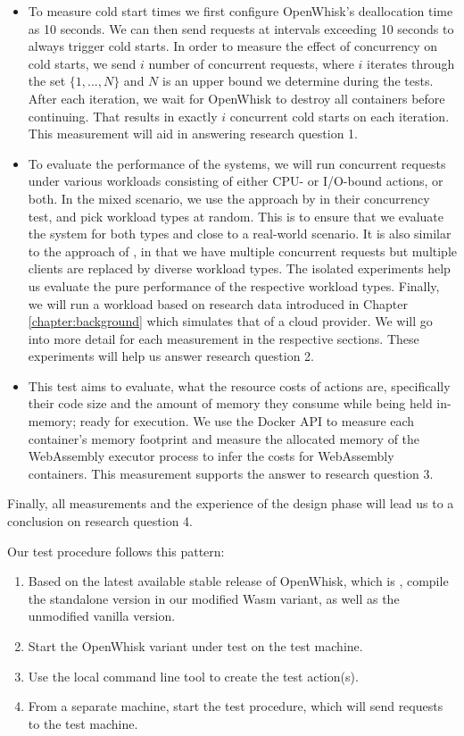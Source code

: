 \begin{itemize}
    \item To measure cold start times we first configure OpenWhisk's deallocation time as 10 seconds. We can then send requests at intervals exceeding 10 seconds to always trigger cold starts. In order to measure the effect of concurrency on cold starts, we send $i$ number of concurrent requests, where $i$ iterates through the set $\{1,...,N\}$ and $N$ is an upper bound we determine during the tests. After each iteration, we wait for OpenWhisk to destroy all containers before continuing. That results in exactly $i$ concurrent cold starts on each iteration. This measurement will aid in answering research question 1.

    \item To evaluate the performance of the systems, we will run concurrent requests under various workloads consisting of either CPU- or I/O-bound actions, or both. In the mixed scenario, we use the approach by \citeauthor{McGrath2017} in their concurrency test, and pick workload types at random. This is to ensure that we evaluate the system for both types and close to a real-world scenario. It is also similar to the approach of \citeauthor{Hall2019}, in that we have multiple concurrent requests but multiple clients are replaced by diverse workload types. The isolated experiments help us evaluate the pure performance of the respective workload types. Finally, we will run a workload based on research data introduced in Chapter \ref{chapter:background} which simulates that of a cloud provider. We will go into more detail for each measurement in the respective sections. These experiments will help us answer research question 2.

    \item This test aims to evaluate, what the resource costs of actions are, specifically their code size and the amount of memory they consume while being held in-memory; ready for execution. We use the Docker API to measure each container's memory footprint and measure the allocated memory of the WebAssembly executor process to infer the costs for WebAssembly containers. This measurement supports the answer to research question 3.
\end{itemize}

Finally, all measurements and the experience of the design phase will lead us to a conclusion on research question 4.

Our test procedure follows this pattern:

\begin{enumerate}
    \item Based on the latest available stable release of OpenWhisk, which is , compile the standalone version in our modified Wasm variant, as well as the unmodified vanilla version.
    \item Start the OpenWhisk variant under test on the test machine.
    \item Use the local  command line tool to create the test action(s).
    \item From a separate machine, start the test procedure, which will send requests to the test machine.
\end{enumerate}

